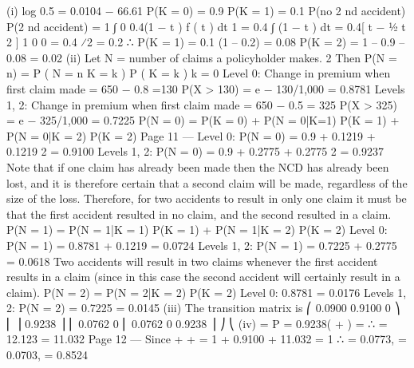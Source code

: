 \documentclass[a4paper,12pt]{article}
\begin{document}
(i)
log 0.5
= 0.0104
− 66.61
P(K = 0) = 0.9
P(K = 1) = 0.1 \times  P(no 2 nd accident)
P(2 nd accident) =
1
∫ 0 0.4(1 − t ) f ( t ) dt
1
= 0.4 ∫ (1 − t ) dt = 0.4[ t − 1⁄2 t 2 ] 1 0
0
= 0.4 ⁄2 = 0.2
∴ P(K = 1) = 0.1 \times  (1 – 0.2) = 0.08
P(K = 2) = 1 – 0.9 – 0.08 = 0.02
(ii)
Let N = number of claims a policyholder makes.
2
Then P(N = n) = \sum  P ( N = n K = k ) P ( K = k )
k = 0
Level 0:
Change in premium when first claim made = 650 − 0.8 =130
P(X > 130) = e − 130/1,000 = 0.8781
Levels 1, 2: Change in premium when first claim made = 650 − 0.5  =
325
P(X > 325) = e − 325/1,000 = 0.7225
P(N = 0) = P(K = 0) + P(N = 0|K=1) P(K = 1)
+ P(N = 0|K = 2) P(K = 2)
Page 11 — %
Level 0:
P(N = 0) = 0.9 + 0.1219  + 0.1219 2 
= 0.9100
Levels 1, 2: P(N = 0) = 0.9 + 0.2775  + 0.2775 2 
= 0.9237
Note that if one claim has already been made then the NCD has already been
lost, and it is therefore certain that a second claim will be made, regardless of
the size of the loss. Therefore, for two accidents to result in only one claim it
must be that the first accident resulted in no claim, and the second resulted in a
claim.
P(N = 1) = P(N = 1|K = 1) P(K = 1) + P(N = 1|K = 2) P(K = 2)
Level 0:
P(N = 1) = 0.8781  + 0.1219 
= 0.0724
Levels 1, 2: P(N = 1) = 0.7225  + 0.2775  
= 0.0618
Two accidents will result in two claims whenever the first accident results in a
claim (since in this case the second accident will certainly result in a claim).
P(N = 2) = P(N = 2|K = 2) P(K = 2)
Level 0:
0.8781  = 0.0176
Levels 1, 2: P(N = 2) = 0.7225  = 0.0145
(iii)
The transition matrix is
⎛ 0.0900 0.9100 0
⎞
⎜
⎟
0.9238 ⎟
⎜ 0.0762 0
⎜ 0.0762 0
0.9238 ⎟ ⎠
⎝
(iv)
\pi  = P  = 
0.9238( +  ) = 
∴  = 12.123 = 11.032
Page 12 — %
Since  +  +  = 1
 + 0.9100 + 11.032 = 1
∴  = 0.0773,  = 0.0703,  = 0.8524
\end{document}
